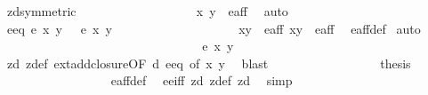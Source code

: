 \begin{isabellebody}
\ z{}{\isacharunderscore}d{\isacharbrackleft}symmetric{\isacharbrackright}\isanewline
\ \ \ \ \ \ \ \ \ \ \ \ \ \ \ \ \isamarkupfalse%
\ {\isacartoucheopen}{\isasymtau}\ {\isacharparenleft}x{\isacharprime}{\isacharcomma}\ y{\isacharprime}{\isacharparenright}\ {\isasymin}\ e{\isacharunderscore}aff{\isacartoucheclose}\ \isamarkupfalse%
\ auto\isanewline
\ \ \ \ \ \ \ \ \ \ \ \ \ \ \isamarkupfalse%
\ e{\isacharunderscore}eq{\isacharcolon}\ {\isachardoublequoteopen}e{\isacharprime}\ x\ y\ {\isacharequal}\ {}{\isachardoublequoteclose}\ {\isachardoublequoteopen}e{\isacharprime}\ x{}\ y{}\ {\isacharequal}\ {}{\isachardoublequoteclose}\isanewline
\ \ \ \ \ \ \ \ \ \ \ \ \ \ \ \ \isamarkupfalse%
\ {\isacartoucheopen}{\isacharparenleft}x{\isacharcomma}y{\isacharparenright}\ {\isasymin}\ e{\isacharunderscore}aff{\isacartoucheclose}\ {\isacartoucheopen}{\isacharparenleft}x{}{\isacharcomma}y{}{\isacharparenright}\ {\isasymin}\ e{\isacharunderscore}aff{\isacartoucheclose}\ \isamarkupfalse%
\ e{\isacharunderscore}aff{\isacharunderscore}def\ \isamarkupfalse%
{\isacharparenleft}auto{\isacharparenright}\isanewline
\ \ \ \ \ \ \ \ \ \ \ \ \ \ \ \ \isanewline
\ \ \ \ \ \ \ \ \ \ \ \ \ \ \isamarkupfalse%
\ {\isachardoublequoteopen}e{\isacharprime}\ x{}\ y{}\ {\isacharequal}\ {}{\isachardoublequoteclose}\ \isanewline
\ \ \ \ \ \ \ \ \ \ \ \ \ \ \ \ \isamarkupfalse%
\ z{}{\isacharunderscore}d\ z{}{\isacharunderscore}def\ ext{\isacharunderscore}add{\isacharunderscore}closure{\isacharbrackleft}OF\ d{\isacharprime}\ e{\isacharunderscore}eq{\isacharcomma}\ of\ x{}\ y{}{\isacharbrackright}\ \isamarkupfalse%
\ blast\isanewline
\ \ \ \ \ \ \ \ \ \ \ \ \ \ \isamarkupfalse%
\ \isamarkupfalse%
\ {\isacharquery}thesis\ \isanewline
\ \ \ \ \ \ \ \ \ \ \ \ \ \ \ \ \isamarkupfalse%
\ e{\isacharunderscore}aff{\isacharunderscore}def\ \isamarkupfalse%
\ e{\isacharunderscore}e{\isacharprime}{\isacharunderscore}iff\ z{}{\isacharunderscore}d\ z{}{\isacharunderscore}def\ z{}{\isacharunderscore}d\ \isamarkupfalse%
\ simp\isanewline
\ \ \ \ \ \ \ \ \ \ \ \ \isamarkupfalse%
\ \ \ \ \ \ \isanewline
\ \ \ \ \ \ \ \ \ \ \ \ \isanewline
\ \ \ \ \ \ \ \ \ \ \ \ \isamarkupfalse%

\end{isabellebody}
